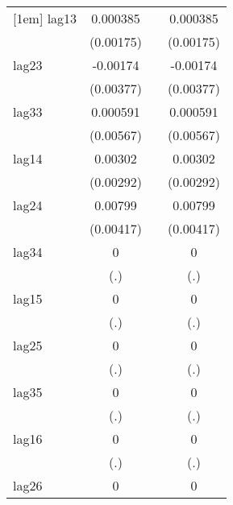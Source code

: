 {\begin{tabular}{l*{3}{c}}
[1em]
lag13       &    0.000385         &                     &    0.000385         \\
            &   (0.00175)         &                     &   (0.00175)         \\
[1em]
lag23       &    -0.00174         &                     &    -0.00174         \\
            &   (0.00377)         &                     &   (0.00377)         \\
[1em]
lag33       &    0.000591         &                     &    0.000591         \\
            &   (0.00567)         &                     &   (0.00567)         \\
[1em]
lag14       &     0.00302         &                     &     0.00302         \\
            &   (0.00292)         &                     &   (0.00292)         \\
[1em]
lag24       &     0.00799         &                     &     0.00799         \\
            &   (0.00417)         &                     &   (0.00417)         \\
[1em]
lag34       &           0         &                     &           0         \\
            &         (.)         &                     &         (.)         \\
[1em]
lag15       &           0         &                     &           0         \\
            &         (.)         &                     &         (.)         \\
[1em]
lag25       &           0         &                     &           0         \\
            &         (.)         &                     &         (.)         \\
[1em]
lag35       &           0         &                     &           0         \\
            &         (.)         &                     &         (.)         \\
[1em]
lag16       &           0         &                     &           0         \\
            &         (.)         &                     &         (.)         \\
[1em]
lag26       &           0         &                     &           0         \\

\end{tabular}}
